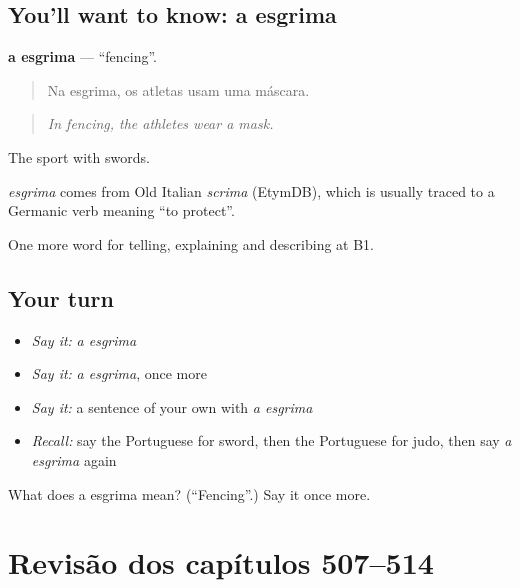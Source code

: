 \subsection*{You'll want to know: a esgrima}
\textbf{a esgrima} — \textquotedblleft{}fencing\textquotedblright{}.

\begin{quote}
Na esgrima, os atletas usam uma máscara.
\end{quote}

\begin{quote}
\emph{In fencing, the athletes wear a mask.}
\end{quote}

The sport with swords.

\begin{cousinweb}
\emph{esgrima} comes from Old Italian \emph{scrima} (EtymDB), which is usually traced to a Germanic verb meaning \textquotedblleft{}to protect\textquotedblright{}.
\end{cousinweb}

\begin{grammarlens}[title={What you've built}]
One more word for telling, explaining and describing at B1.
\end{grammarlens}

\subsection*{Your turn}
\begin{itemize}
\raggedright
  \item \emph{Say it:} \emph{a esgrima}
  \item \emph{Say it:} \emph{a esgrima}, once more
  \item \emph{Say it:} a sentence of your own with \emph{a esgrima}
  \item \emph{Recall:} say the Portuguese for sword, then the Portuguese for judo, then say \emph{a esgrima} again
\end{itemize}

\begin{tcolorbox}[breakable,colback=teal!4,colframe=teal!35!black,title={Before you move on}]
What does a esgrima mean? (\textquotedblleft{}Fencing\textquotedblright{}.) Say it once more.
\end{tcolorbox}
\section[(dialogue)]{Revisão dos capítulos 507–514}


